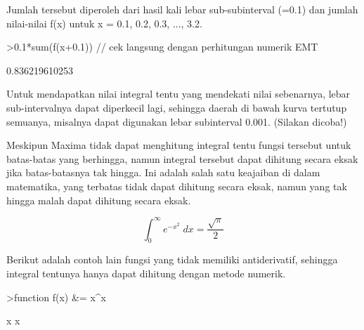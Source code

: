 \documentclass[a4paper,10pt]{article}
\begin{document}
\begin{eulernotebook}
\begin{eulercomment}
\begin{eulercomment}
\begin{eulercomment}
Jumlah tersebut diperoleh dari hasil kali lebar sub-subinterval (=0.1) dan jumlah
nilai-nilai f(x) untuk x = 0.1, 0.2, 0.3, ..., 3.2.
\end{eulercomment}
\begin{eulerprompt}
>0.1*sum(f(x+0.1)) // cek langsung dengan perhitungan numerik EMT
\end{eulerprompt}
\begin{euleroutput}
  0.836219610253
\end{euleroutput}
\begin{eulercomment}
Untuk mendapatkan nilai integral tentu yang mendekati nilai sebenarnya, lebar
sub-intervalnya dapat diperkecil lagi, sehingga daerah di bawah kurva tertutup
semuanya, misalnya dapat digunakan lebar subinterval 0.001. (Silakan dicoba!)

Meskipun Maxima tidak dapat menghitung integral tentu fungsi tersebut untuk
batas-batas yang berhingga, namun integral tersebut dapat dihitung secara eksak jika
batas-batasnya tak hingga. Ini adalah salah satu keajaiban di dalam matematika, yang
terbatas tidak dapat dihitung secara eksak, namun yang tak hingga malah dapat
dihitung secara eksak.
\end{eulercomment}
\begin{eulerformula}
\[
\int_{0}^{\infty }{e^ {- x^2 }\;dx}=\frac{\sqrt{\pi}}{2}
\]
\end{eulerformula}
\begin{eulercomment}
Berikut adalah contoh lain fungsi yang tidak memiliki antiderivatif, sehingga
integral tentunya hanya dapat dihitung dengan metode numerik.
\end{eulercomment}
\begin{eulerprompt}
>function f(x) &= x^x
\end{eulerprompt}
\begin{euleroutput}
  
                                     x
                                    x
  

\end{euleroutput}
\end{eulercomment}
\end{eulercomment}
\end{eulernotebook}
\end{document}
